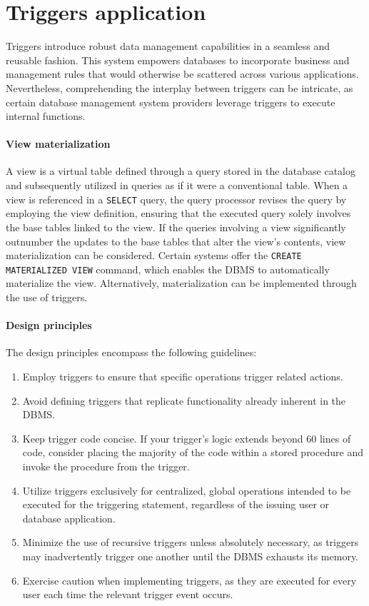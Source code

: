 \section{Triggers application}

Triggers introduce robust data management capabilities in a seamless and reusable fashion. 
This system empowers databases to incorporate business and management rules that would otherwise be scattered across various applications. 
Nevertheless, comprehending the interplay between triggers can be intricate, as certain database management system  providers leverage triggers to execute internal functions.

\paragraph*{View materialization}
A view is a virtual table defined through a query stored in the database catalog and subsequently utilized in queries as if it were a conventional table. 
When a view is referenced in a \texttt{SELECT} query, the query processor revises the query by employing the view definition, ensuring that the executed query solely involves the base tables linked to the view.   
If the queries involving a view significantly outnumber the updates to the base tables that alter the view's contents, view materialization can be considered.  
Certain systems offer the \texttt{CREATE MATERIALIZED VIEW} command, which enables the DBMS to automatically materialize the view. 
Alternatively, materialization can be implemented through the use of triggers.

\paragraph*{Design principles}
The design principles encompass the following guidelines:
\begin{enumerate}
    \item Employ triggers to ensure that specific operations trigger related actions.
    \item Avoid defining triggers that replicate functionality already inherent in the DBMS. 
    \item Keep trigger code concise. 
        If your trigger's logic extends beyond 60 lines of code, consider placing the majority of the code within a stored procedure and invoke the procedure from the trigger.
    \item Utilize triggers exclusively for centralized, global operations intended to be executed for the triggering statement, regardless of the issuing user or database application.
    \item Minimize the use of recursive triggers unless absolutely necessary, as triggers may inadvertently trigger one another until the DBMS exhausts its memory.
    \item Exercise caution when implementing triggers, as they are executed for every user each time the relevant trigger event occurs.
\end{enumerate}

